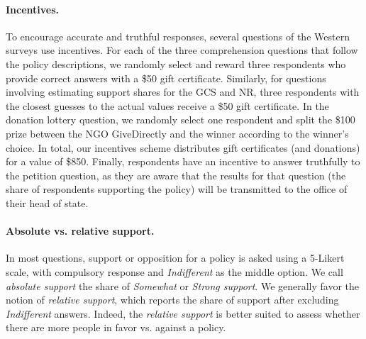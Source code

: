 \begin{small}
\paragraph{\small Incentives.} %
To encourage accurate and truthful responses, several questions of the Western surveys use incentives. For each of the three comprehension questions that follow the policy descriptions, we randomly select and reward three respondents who provide correct answers with a \$50 gift certificate. Similarly, for questions involving estimating support shares for the GCS and NR, three respondents with the closest guesses to the actual values receive a \$50 gift certificate. In the donation lottery question, we randomly select one respondent and split the \$100 prize between the NGO GiveDirectly and the winner according to the winner's choice. In total, our incentives scheme distributes gift certificates (and donations) for a value of \$850. Finally, respondents have an incentive to answer truthfully to the petition question, as they are aware that the results for that question (the share of respondents supporting the policy) will be transmitted to the office of their head of state.


\paragraph{\small Absolute vs. relative support.}
In most questions, support or opposition for a policy is asked using a 5-Likert scale, with compulsory response and \textit{Indifferent} as the middle option. We call \textit{absolute support} the share of \textit{Somewhat} or \textit{Strong support}. We generally favor the notion of \textit{relative support}, which reports the share of support after excluding \textit{Indifferent} answers. Indeed, the \textit{relative support} is better suited to assess whether there are more people in favor vs. against a policy.


\end{small}

